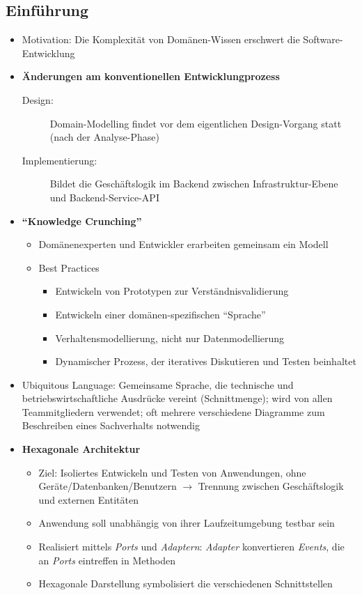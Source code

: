 \subsection{Einführung}
\begin{itemize}
	\item Motivation: Die Komplexität von Domänen-Wissen erschwert die Software-Entwicklung
	\item \textbf{Änderungen am konventionellen Entwicklungprozess}
	\begin{description}
		\item[Design:] Domain-Modelling findet vor dem eigentlichen Design-Vorgang statt (nach der Analyse-Phase)
		\item[Implementierung:] Bildet die Geschäftslogik im Backend zwischen Infrastruktur-Ebene und Backend-Service-API
	\end{description}
	\item \textbf{"`Knowledge Crunching"'}
	\begin{itemize}
		\item Domänenexperten und Entwickler erarbeiten gemeinsam ein Modell
		\item Best Practices
		\begin{itemize}
			\item Entwickeln von Prototypen zur Verständnisvalidierung
			\item Entwickeln einer domänen-spezifischen "`Sprache"'
			\item Verhaltensmodellierung, nicht nur Datenmodellierung
			\item Dynamischer Prozess, der iteratives Diskutieren und Testen beinhaltet
		\end{itemize}
	\end{itemize}
	\item Ubiquitous Language: Gemeinsame Sprache, die technische und betriebswirtschaftliche Ausdrücke vereint (Schnittmenge); wird von allen Teammitgliedern verwendet; oft mehrere verschiedene Diagramme zum Beschreiben eines Sachverhalts notwendig
	\item \textbf{Hexagonale Architektur}
	\begin{itemize}
		\item Ziel: Isoliertes Entwickeln und Testen von Anwendungen, ohne Geräte/Datenbanken/Benutzern \(\rightarrow\) Trennung zwischen Geschäftslogik und externen Entitäten
		\item Anwendung soll unabhängig von ihrer Laufzeitumgebung testbar sein
		\item Realisiert mittels \textit{Ports} und \textit{Adaptern}: \textit{Adapter} konvertieren \textit{Events}, die an \textit{Ports} eintreffen in Methoden
		\item Hexagonale Darstellung symbolisiert die verschiedenen Schnittstellen
	\end{itemize}
\end{itemize}


